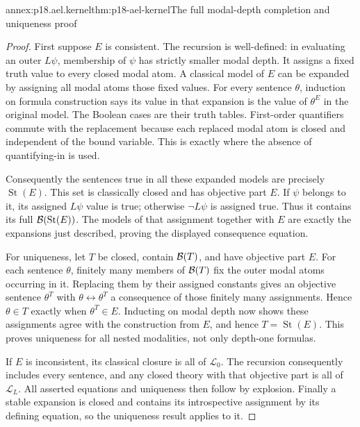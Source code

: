 \begin{annexitem}{annex:p18.ael.kernel}{thm:p18-ael-kernel}{The full modal-depth completion and uniqueness proof}
\begin{proof}
First suppose \(E\) is consistent.
The recursion is well-defined:
in evaluating an outer \(L\psi\),
membership of \(\psi\) has strictly
smaller modal depth. It assigns
a fixed truth value to every
closed modal atom. A classical
model of \(E\) can be expanded
by assigning all modal atoms
those fixed values. For every
sentence \(\theta\), induction
on formula construction says
its value in that expansion
is the value of \(\theta^E\)
in the original model.
The Boolean cases are their
truth tables. First-order
quantifiers commute with the
replacement because each
replaced modal atom is closed
and independent of the bound
variable. This is exactly
where the absence of
quantifying-in is used.

Consequently the sentences
true in all these expanded
models are precisely
\(\operatorname{St}(E)\).
This set is classically
closed and has objective
part \(E\). If \(\psi\)
belongs to it, its assigned
\(L\psi\) value is true;
otherwise \(\neg L\psi\)
is assigned true. Thus it
contains its full
\({\cal B}(\operatorname{St}(E))\).
The models of that assignment
together with \(E\) are
exactly the expansions just
described, proving the
displayed consequence equation.

For uniqueness, let \(T\)
be closed, contain
\({\cal B}(T)\), and have
objective part \(E\).
For each sentence \(\theta\),
finitely many members of
\({\cal B}(T)\) fix the
outer modal atoms occurring
in it. Replacing them by
their assigned constants
gives an objective sentence
\(\theta^T\) with
\(\theta\leftrightarrow\theta^T\)
a consequence of those
finitely many assignments.
Hence \(\theta\in T\)
exactly when \(\theta^T\in E\).
Inducting on modal depth
now shows these assignments
agree with the construction
from \(E\), and hence
\(T=\operatorname{St}(E)\).
This proves uniqueness for
all nested modalities, not
only depth-one formulas.

If \(E\) is inconsistent,
its classical closure is
all of \(\mathcal L_0\).
The recursion consequently
includes every sentence,
and any closed theory
with that objective part
is all of \(\mathcal L_L\).
All asserted equations
and uniqueness then follow
by explosion. Finally a
stable expansion is closed
and contains its introspective
assignment by its defining
equation, so the uniqueness
result applies to it.
\end{proof}
\end{annexitem}

